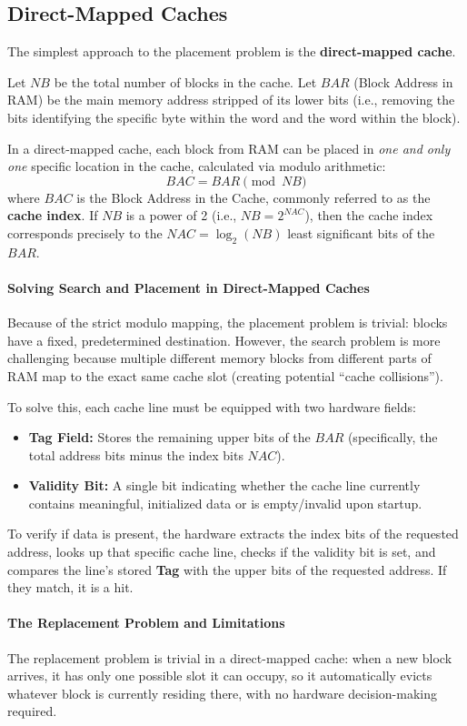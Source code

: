 \subsection{Direct-Mapped Caches}
The simplest approach to the placement problem is the \textbf{direct-mapped cache}. 

Let $NB$ be the total number of blocks in the cache. Let $BAR$ (Block Address in RAM) be the main memory address stripped of its lower bits (i.e., removing the bits identifying the specific byte within the word and the word within the block). 

In a direct-mapped cache, each block from RAM can be placed in \textit{one and only one} specific location in the cache, calculated via modulo arithmetic:
\[ BAC = BAR \pmod{NB} \]
where $BAC$ is the Block Address in the Cache, commonly referred to as the \textbf{cache index}. If $NB$ is a power of 2 (i.e., $NB = 2^{NAC}$), then the cache index corresponds precisely to the $NAC = \log_2(NB)$ least significant bits of the $BAR$.

\paragraph{Solving Search and Placement in Direct-Mapped Caches}
Because of the strict modulo mapping, the placement problem is trivial: blocks have a fixed, predetermined destination. However, the search problem is more challenging because multiple different memory blocks from different parts of RAM map to the exact same cache slot (creating potential ``cache collisions'').

To solve this, each cache line must be equipped with two hardware fields:
\begin{itemize}
    \item \textbf{Tag Field:} Stores the remaining upper bits of the $BAR$ (specifically, the total address bits minus the index bits $NAC$). 
    \item \textbf{Validity Bit:} A single bit indicating whether the cache line currently contains meaningful, initialized data or is empty/invalid upon startup.
\end{itemize}
To verify if data is present, the hardware extracts the index bits of the requested address, looks up that specific cache line, checks if the validity bit is set, and compares the line's stored \textbf{Tag} with the upper bits of the requested address. If they match, it is a hit.

\paragraph{The Replacement Problem and Limitations}
The replacement problem is trivial in a direct-mapped cache: when a new block arrives, it has only one possible slot it can occupy, so it automatically evicts whatever block is currently residing there, with no hardware decision-making required. 

